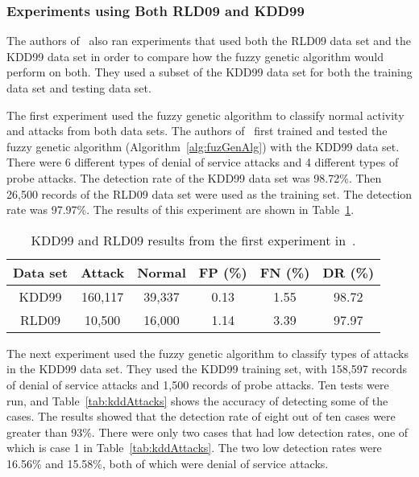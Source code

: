 \documentclass{sig-alternate}
\begin{document}
\subsubsection{Experiments using Both RLD09 and KDD99}
The authors of~\cite{6559603} also ran experiments that used both the RLD09 data set and the KDD99 data set in order to compare how the fuzzy genetic algorithm would perform on both. They used a subset of the KDD99 data set for both the training data set and testing data set.

The first experiment used the fuzzy genetic algorithm to classify normal activity and attacks from both data sets. The authors of~\cite{6559603} first trained and tested the fuzzy genetic algorithm (Algorithm~\ref{alg:fuzGenAlg}) with the KDD99 data set. There were 6 different types of denial of service attacks and 4 different types of probe attacks. The detection rate of the KDD99 data set was 98.72\%. Then 26,500 records of the RLD09 data set were used as the training set. The detection rate was 97.97\%. The results of this experiment are shown in Table~\ref{tab:bothSetsResults}.

\begin{table}
\caption{KDD99 and RLD09 results from the first experiment in~\cite{6559603}.}
\vspace{0.20cm}
\begin{tabular}{cccccc}
Data set & Attack & Normal & FP (\%) & FN (\%) & DR (\%)\\ \hline
KDD99 & 160,117 & 39,337 & 0.13 & 1.55 & 98.72\\
RLD09 & 10,500 & 16,000 & 1.14 & 3.39 & 97.97\\
\end{tabular}
\label{tab:bothSetsResults}
\end{table}

The next experiment used the fuzzy genetic algorithm to classify types of attacks in the KDD99 data set. They used the KDD99 training set, with 158,597 records of denial of service attacks and 1,500 records of probe attacks. Ten tests were run, and Table~\ref{tab:kddAttacks} shows the accuracy of detecting some of the cases. The results showed that the detection rate of eight out of ten cases were greater than 93\%. There were only two cases that had low detection rates, one of which is case 1 in Table~\ref{tab:kddAttacks}. The two low detection rates were 16.56\% and 15.58\%, both of which were denial of service attacks.
\end{document}

